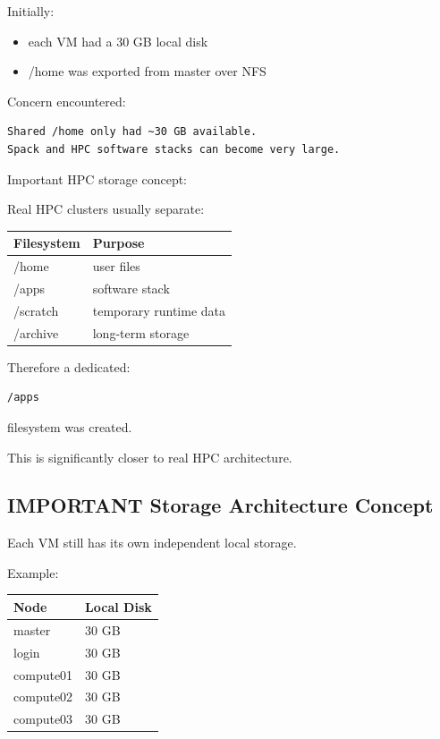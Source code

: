 \documentclass[11pt]{article}
\begin{document}
Initially:

\begin{itemize}
\item each VM had a 30 GB local disk
\item /home was exported from master over NFS
\end{itemize}

Concern encountered:

\begin{verbatim}
Shared /home only had ~30 GB available.
Spack and HPC software stacks can become very large.
\end{verbatim}

Important HPC storage concept:

Real HPC clusters usually separate:

\begin{center}
\begin{tabular}{ll}
Filesystem & Purpose\\
\hline
/home & user files\\
/apps & software stack\\
/scratch & temporary runtime data\\
/archive & long-term storage\\
\end{tabular}
\end{center}

Therefore a dedicated:

\begin{verbatim}
/apps
\end{verbatim}

filesystem was created.

This is significantly closer to real HPC architecture.
\subsection{IMPORTANT Storage Architecture Concept}
\label{sec:orgafb3aea}

Each VM still has its own independent local storage.

Example:

\begin{center}
\begin{tabular}{ll}
Node & Local Disk\\
\hline
master & 30 GB\\
login & 30 GB\\
compute01 & 30 GB\\
compute02 & 30 GB\\
compute03 & 30 GB\\
\end{tabular}
\end{center}
\end{document}
